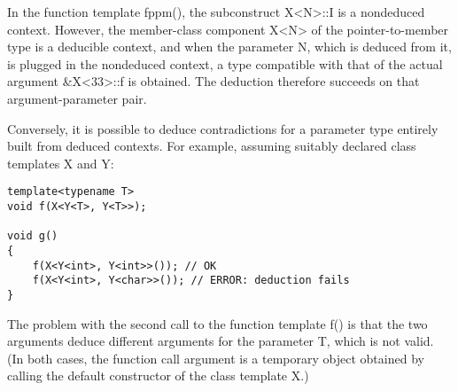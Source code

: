 In the function template fppm(), the subconstruct X<N>::I is a nondeduced context. However, the member-class component X<N> of the pointer-to-member type is a deducible context, and when the parameter N, which is deduced from it, is plugged in the nondeduced context, a type compatible with that of the actual argument \&X<33>::f is obtained. The deduction therefore succeeds on that argument-parameter pair.

Conversely, it is possible to deduce contradictions for a parameter type entirely built from deduced contexts. For example, assuming suitably declared class templates X and Y:

\begin{lstlisting}[style=styleCXX]
template<typename T>
void f(X<Y<T>, Y<T>>);

void g()
{
	f(X<Y<int>, Y<int>>()); // OK
	f(X<Y<int>, Y<char>>()); // ERROR: deduction fails
}
\end{lstlisting}

The problem with the second call to the function template f() is that the two arguments deduce different arguments for the parameter T, which is not valid. (In both cases, the function call argument is a temporary object obtained by calling the default constructor of the class template X.)
































